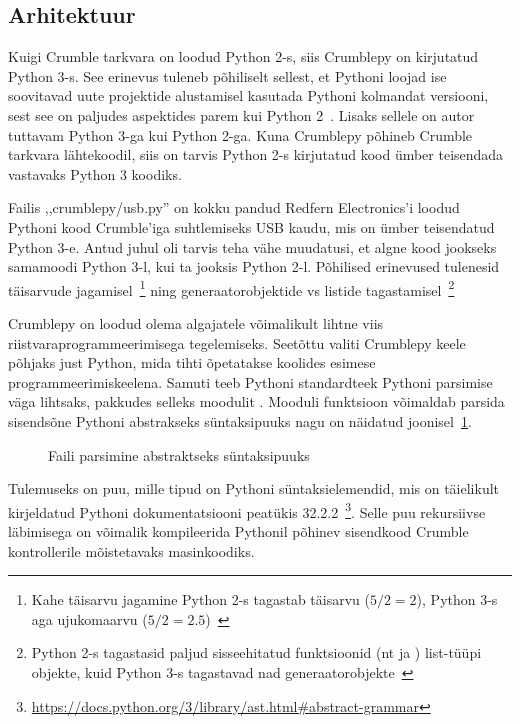 \documentclass[12pt]{article}
\begin{document}
\subsection{Arhitektuur}

Kuigi Crumble tarkvara on loodud Python 2-s, siis Crumblepy on kirjutatud Python 3-s. See erinevus tuleneb põhiliselt sellest, et Pythoni loojad ise soovitavad uute projektide alustamisel kasutada Pythoni kolmandat versiooni, sest see on paljudes aspektides parem kui Python 2~\cite{Python2orPython3-PythonWiki}. Lisaks sellele on autor tuttavam Python 3-ga kui Python 2-ga. Kuna Crumblepy põhineb Crumble tarkvara lähtekoodil, siis on tarvis Python 2-s kirjutatud kood ümber teisendada vastavaks Python 3 koodiks. 

Failis ,,crumblepy/usb.py'' on kokku pandud Redfern Electronics'i loodud Pythoni kood Crumble'iga suhtlemiseks USB kaudu, mis on ümber teisendatud Python 3-e. Antud juhul oli tarvis teha vähe muudatusi, et algne kood jookseks samamoodi Python 3-l, kui ta jooksis Python 2-l. Põhilised erinevused tulenesid täisarvude jagamisel~\footnote{Kahe täisarvu jagamine Python 2-s tagastab täisarvu ($5/2 = 2$), Python 3-s aga ujukomaarvu ($5/2 = 2.5$)~\cite{KeyDifferences}} ning generaatorobjektide vs listide tagastamisel~\footnote{Python 2-s tagastasid paljud sisseehitatud funktsioonid (nt  ja ) list-tüüpi objekte, kuid Python 3-s tagastavad nad generaatorobjekte~\cite{KeyDifferences}}

Crumblepy on loodud olema algajatele võimalikult lihtne viis riistvaraprogrammeerimisega tegelemiseks. Seetõttu valiti Crumblepy keele põhjaks just Python, mida tihti õpetatakse koolides esimese programmeerimiskeelena. Samuti teeb Pythoni standardteek Pythoni parsimise väga lihtsaks, pakkudes selleks  moodulit \cite{PythonAST}. Mooduli funktsioon  võimaldab parsida sisendsõne Pythoni abstrakseks süntaksipuuks nagu on näidatud joonisel~\ref{astparse}.

\begin{figure}[ht]
	\label{astparse}
	\caption{Faili parsimine abstraktseks süntaksipuuks}
\end{figure}

Tulemuseks on puu, mille tipud on Pythoni süntaksielemendid, mis on täielikult kirjeldatud Pythoni dokumentatsiooni peatükis 32.2.2~\footnote{\url{https://docs.python.org/3/library/ast.html#abstract-grammar}}. Selle puu rekursiivse läbimisega on võimalik kompileerida Pythonil põhinev sisendkood Crumble kontrollerile mõistetavaks masinkoodiks.
\end{document}
